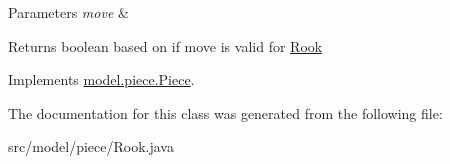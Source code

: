 \begin{DoxyParams}{Parameters}
{\em move} & \\
\hline
\end{DoxyParams}
\begin{DoxyReturn}{Returns}
boolean based on if move is valid for \hyperlink{classmodel_1_1piece_1_1_rook}{Rook} 
\end{DoxyReturn}


Implements \hyperlink{classmodel_1_1piece_1_1_piece_af7ce06755c9f20f3481796ca5b512849}{model.\-piece.\-Piece}.



The documentation for this class was generated from the following file\-:\begin{DoxyCompactItemize}
\item 
src/model/piece/Rook.\-java\end{DoxyCompactItemize}
